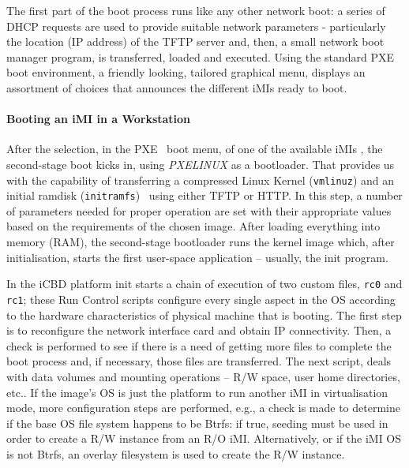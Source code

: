 The first part of the boot process runs like any other network boot: a series of DHCP requests are used to provide suitable network parameters - particularly the location (IP address) of the TFTP server and, then, a small network boot manager program, is transferred, loaded and executed. Using the standard PXE boot environment, a friendly looking, tailored graphical menu, displays an assortment of choices that announces the different iMIs ready to boot.

\paragraph{Booting an iMI in a Workstation}
\label{subsub:icbd_booting_imi}

After the selection, in the PXE~\cite{ibm_linux_boot} boot menu, of one of the available iMIs , the second-stage boot kicks in, using \textit{PXELINUX} as a bootloader. That provides us with the capability of transferring a compressed Linux Kernel (\texttt{vmlinuz}) and an initial ramdisk (\texttt{initramfs})~\cite{ibm_initrd} using either TFTP or HTTP. In this step, a number of parameters needed for proper operation are set with their appropriate values based on the requirements of the chosen image. After loading everything into memory (RAM), the second-stage bootloader runs the kernel image which, after initialisation, starts the first user-space application – usually, the init program.

In the iCBD platform init starts a chain of execution of two custom files, \texttt{rc0} and \texttt{rc1}; these Run Control scripts configure every single aspect in the OS according to the hardware characteristics of physical machine that is booting. The first step is to reconfigure the network interface card and obtain IP connectivity. Then, a check is performed to see if there is a need of getting more files to complete the boot process and, if necessary, those files are transferred. The next script, deals with data volumes and mounting operations – R/W space, user home directories, etc.. If the image’s OS is just the platform to run another iMI in virtualisation mode, more configuration steps are performed, e.g., a check is made to determine if the base OS file system happens to be Btrfs: if true, seeding must be used in order to create a R/W instance from an R/O iMI. Alternatively, or if the iMI OS is not Btrfs, an overlay filesystem is used to create the R/W instance.

